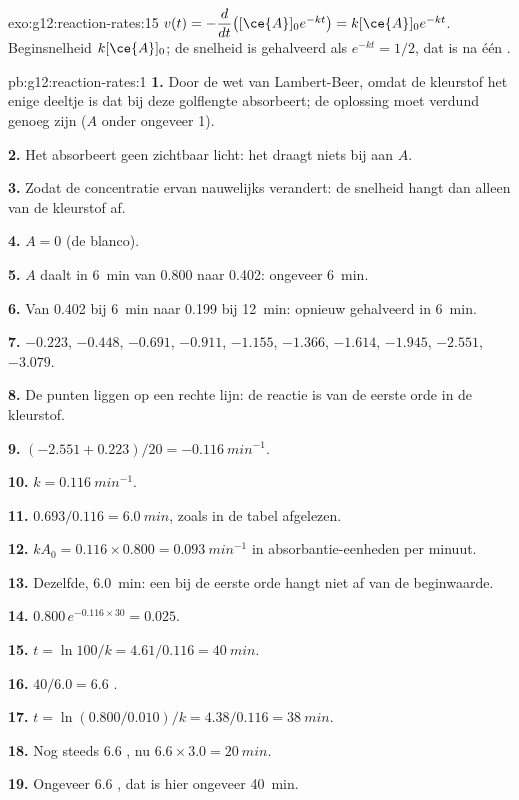 \begin{solution}{exo:g12:reaction-rates:15}
$v(t) = -\dfrac{d}{dt}\big([\ce{A}]_0 e^{-kt}\big) = k[\ce{A}]_0 e^{-kt}$.
Beginsnelheid $k[\ce{A}]_0$; de snelheid is gehalveerd als
$e^{-kt} = 1/2$, dat is na één .
\end{solution}

\begin{solution}{pb:g12:reaction-rates:1}
\textbf{1.} Door de wet van Lambert-Beer, omdat de kleurstof het enige
deeltje is dat bij deze golflengte absorbeert; de oplossing moet verdund
genoeg zijn ($A$ onder ongeveer 1).

\textbf{2.} Het absorbeert geen zichtbaar licht: het draagt niets bij
aan $A$.

\textbf{3.} Zodat de concentratie ervan nauwelijks verandert: de snelheid
hangt dan alleen van de kleurstof af.

\textbf{4.} $A = 0$ (de blanco).

\textbf{5.} $A$ daalt in \qty{6}{min} van 0.800 naar 0.402: ongeveer
\qty{6}{min}.

\textbf{6.} Van 0.402 bij \qty{6}{min} naar 0.199 bij \qty{12}{min}:
opnieuw gehalveerd in \qty{6}{min}.

\textbf{7.} $-0.223$, $-0.448$, $-0.691$, $-0.911$, $-1.155$, $-1.366$,
$-1.614$, $-1.945$, $-2.551$, $-3.079$.

\textbf{8.} De punten liggen op een rechte lijn: de reactie is van de
eerste orde in de kleurstof.

\textbf{9.} $(-2.551 + 0.223)/20 = \qty{-0.116}{min^{-1}}$.

\textbf{10.} $k = \qty{0.116}{min^{-1}}$.

\textbf{11.} $0.693 / 0.116 = \qty{6.0}{min}$, zoals in de tabel
afgelezen.

\textbf{12.} $k A_0 = 0.116 \times 0.800 = \qty{0.093}{min^{-1}}$ in
absorbantie-eenheden per minuut.

\textbf{13.} Dezelfde, \qty{6.0}{min}: een  bij de eerste
orde hangt niet af van de beginwaarde.

\textbf{14.} $0.800\, e^{-0.116 \times 30} = 0.025$.

\textbf{15.} $t = \ln 100 / k = 4.61 / 0.116 = \qty{40}{min}$.

\textbf{16.} $40 / 6.0 = 6.6$ .

\textbf{17.} $t = \ln(0.800/0.010)/k = 4.38 / 0.116 = \qty{38}{min}$.

\textbf{18.} Nog steeds 6.6 , nu
$6.6 \times 3.0 = \qty{20}{min}$.

\textbf{19.} Ongeveer 6.6 , dat is hier ongeveer
\qty{40}{min}.
\end{solution}
